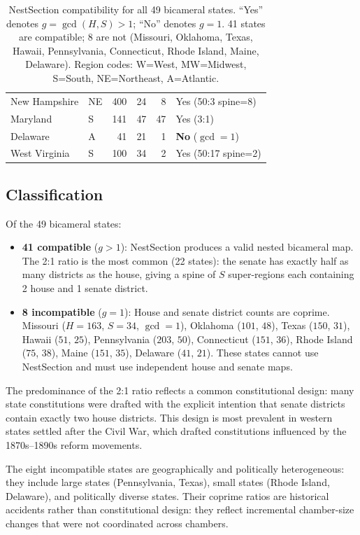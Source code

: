 \begin{table}[h]
\begin{tabular}{llrrrl}
New Hampshire & NE   & 400 & 24  & 8   & Yes (50:3 spine=8) \\
Maryland      & S    & 141 & 47  & 47  & Yes (3:1) \\
Delaware      & A    & 41  & 21  & 1   & \textbf{No} ($\gcd=1$) \\
West Virginia & S    & 100 & 34  & 2   & Yes (50:17 spine=2) \\
\bottomrule
\end{tabular}
\caption{NestSection compatibility for all 49 bicameral states.
  ``Yes'' denotes $g = \gcd(H,S) > 1$; ``No'' denotes $g = 1$.
  41 states are compatible; 8 are not (Missouri, Oklahoma, Texas, Hawaii,
  Pennsylvania, Connecticut, Rhode Island, Maine, Delaware).
  Region codes: W=West, MW=Midwest, S=South, NE=Northeast, A=Atlantic.}
\label{tab:ratios-all}
\end{table}

\subsection{Classification}
\label{sec:analysis:classification}

Of the 49 bicameral states:
\begin{itemize}
  \item \textbf{41 compatible} ($g > 1$): NestSection produces a valid
    nested bicameral map. The 2:1 ratio is the most common (22 states):
    the senate has exactly half as many districts as the house, giving a
    spine of $S$ super-regions each containing 2 house and 1 senate district.
  \item \textbf{8 incompatible} ($g = 1$): House and senate district counts
    are coprime. Missouri ($H=163$, $S=34$, $\gcd=1$), Oklahoma ($101$, $48$),
    Texas ($150$, $31$), Hawaii ($51$, $25$), Pennsylvania ($203$, $50$),
    Connecticut ($151$, $36$), Rhode Island ($75$, $38$), Maine ($151$, $35$),
    Delaware ($41$, $21$).
    These states cannot use NestSection and must use independent
    house and senate maps.
\end{itemize}

The predominance of the 2:1 ratio reflects a common constitutional design:
many state constitutions were drafted with the explicit intention that senate
districts contain exactly two house districts. This design is most prevalent
in western states settled after the Civil War, which drafted constitutions
influenced by the 1870s--1890s reform movements.

The eight incompatible states are geographically and politically heterogeneous:
they include large states (Pennsylvania, Texas), small states (Rhode Island,
Delaware), and politically diverse states. Their coprime ratios are historical
accidents rather than constitutional design: they reflect incremental chamber-size
changes that were not coordinated across chambers.
